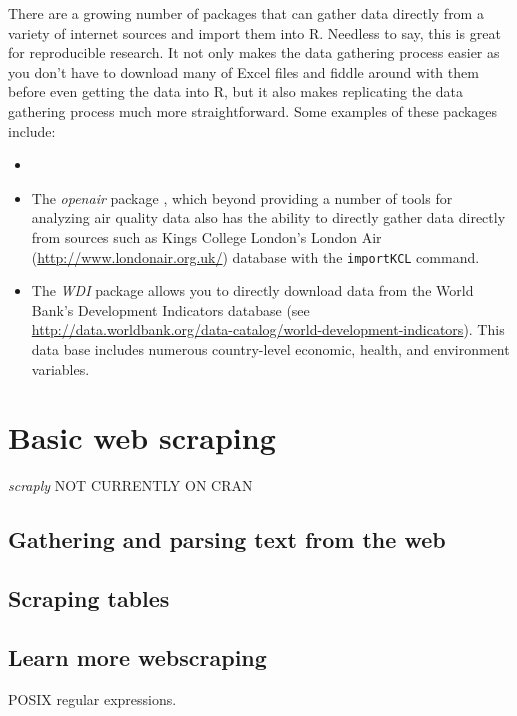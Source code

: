 There are a growing number of packages that can gather data directly from a variety of internet sources and import them into R. Needless to say, this is great for reproducible research. It not only makes the data gathering process easier as you don't have to download many of Excel files and fiddle around with them before even getting the data into R, but it also makes replicating the data gathering process much more straightforward. Some examples of these packages include: 

\begin{itemize}
	\item {}
	\item The \emph{openair} package \cite{R-openair}, which beyond providing a number of tools for analyzing air quality data also has the ability to directly gather data directly from sources such as Kings College London's London Air (\url{http://www.londonair.org.uk/}) database with the \texttt{importKCL} command.
	\item The \emph{WDI} package \cite{R-WDI} allows you to directly download data from the World Bank's Development Indicators database (see \url{http://data.worldbank.org/data-catalog/world-development-indicators}). This data base includes numerous country-level economic, health, and environment variables. 
\end{itemize}

\section{Basic web scraping}

\emph{scraply}  NOT CURRENTLY ON CRAN



\subsection{Gathering and parsing text from the web}

\subsection{Scraping tables}

\subsection{Learn more webscraping}

POSIX regular expressions.

